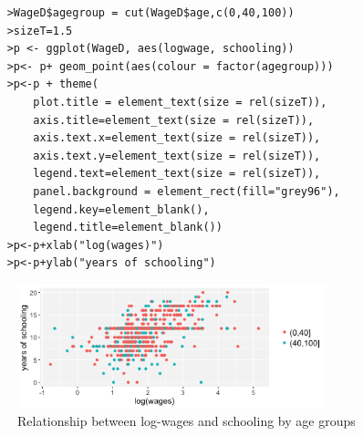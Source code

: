 \documentclass[11pt,letterpaper]{article}
\begin{document}
\begin{verbatim}
    >WageD$agegroup = cut(WageD$age,c(0,40,100))
    >sizeT=1.5
    >p <- ggplot(WageD, aes(logwage, schooling))
    >p<- p+ geom_point(aes(colour = factor(agegroup)))
    >p<-p + theme(
        plot.title = element_text(size = rel(sizeT)),
        axis.title=element_text(size = rel(sizeT)),
        axis.text.x=element_text(size = rel(sizeT)),
        axis.text.y=element_text(size = rel(sizeT)),
        legend.text=element_text(size = rel(sizeT)),
        panel.background = element_rect(fill="grey96"),
        legend.key=element_blank(),
        legend.title=element_blank())
    >p<-p+xlab("log(wages)")
    >p<-p+ylab("years of schooling")
\end{verbatim}

\begin{figure}[H]
\begin{center}
\caption{Relationship between log-wages and schooling by age groups}
\label{fig:logwagedugroups}
\includegraphics[width=0.8\textwidth]{LogWageSchoolingGroup.png}
\end{center}
\end{figure}
\end{document}
